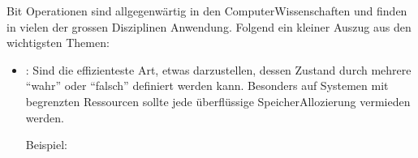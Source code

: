 \documentclass[a4paper,10pt,english]{report}
\begin{document}
\sphinxAtStartPar
Bit Operationen sind allgegenwärtig in den Computer\sphinxhyphen{}Wissenschaften und finden in vielen der grossen Disziplinen Anwendung. Folgend ein kleiner Auszug aus den wichtigsten Themen:
\begin{itemize}
\item {} 
\sphinxAtStartPar
{}: Sind die effizienteste Art, etwas darzustellen, dessen Zustand durch mehrere “wahr” oder “falsch” definiert werden kann. Besonders auf Systemen mit begrenzten Ressourcen sollte jede überflüssige Speicher\sphinxhyphen{}Allozierung vermieden werden.

\sphinxAtStartPar
Beispiel:

\begin{sphinxVerbatim}[commandchars=\\\{\}]
  

  
\end{sphinxVerbatim}

\end{itemize}
\end{document}
